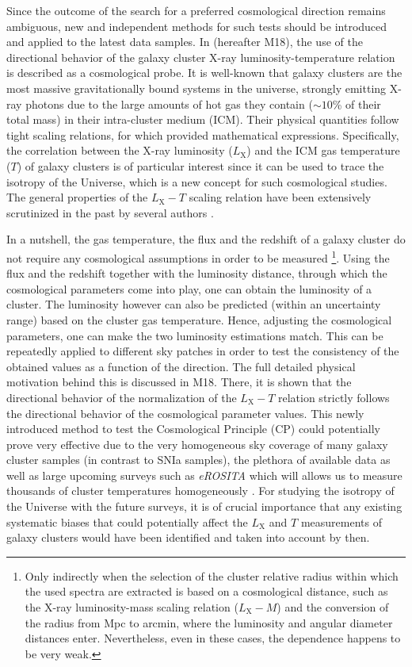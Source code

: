 \documentclass{aa}   %
\begin{document}
Since the outcome of the search for a preferred cosmological direction remains ambiguous, new and independent methods for such tests should be introduced and applied to the latest data samples. In \citet{Migkas18} (hereafter M18), the use of the directional behavior of the galaxy cluster X-ray luminosity-temperature relation is described as a cosmological probe. It is well-known that galaxy clusters are the most massive gravitationally bound systems in the universe, strongly emitting X-ray photons due to the large amounts of hot gas they contain ($\sim 10$\% of their total mass) in their intra-cluster medium (ICM). Their physical quantities follow tight scaling relations, for which \citet{kaiser} provided mathematical expressions. Specifically, the correlation between the X-ray luminosity ($L_{\text{X}}$) and the ICM gas temperature ($T$) of galaxy clusters is of particular interest since it can be used to trace the isotropy of the Universe, which is a new concept for such cosmological studies. The general properties of the $L_{\text{X}}-T$ scaling relation have been extensively scrutinized in the past by several authors \citep[e.g.,][]{vikhl02,pacaud07,pratt,mittal,reichert,hilton,maughan,bharad,lovisari,giles,zou,Migkas18,xcs2}.

In a nutshell, the gas temperature, the flux and the redshift of a galaxy cluster do not require any cosmological assumptions in order to be measured \footnote{Only indirectly when the selection of the cluster relative radius within which the used spectra are extracted is based on a cosmological distance, such as the X-ray luminosity-mass scaling relation ($L_{\text{X}}-M$) and the conversion of the radius from Mpc to arcmin, where the luminosity and angular diameter distances enter. Nevertheless, even in these cases, the dependence happens to be very weak.}. Using the flux and the redshift together with the luminosity distance, through which the cosmological parameters come into play, one can obtain the luminosity of a cluster. The luminosity however can also be predicted (within an uncertainty range) based on the cluster gas temperature. Hence, adjusting the cosmological parameters, one can make the two luminosity estimations match. This can be repeatedly applied to different sky patches in order to test the consistency of the obtained values as a function of the direction. The full detailed physical motivation behind this is discussed in M18. There, it is shown that the directional behavior of the normalization of the $L_{\text{X}}-T$ relation strictly follows the directional behavior of the cosmological parameter values. This newly introduced method to test the Cosmological Principle (CP) could potentially prove very effective due to the very homogeneous sky coverage of many galaxy cluster samples (in contrast to SNIa samples), the plethora of available data as well as large upcoming surveys such as \textit{eROSITA} \citep{erosita16} which will allows us to measure thousands of cluster temperatures homogeneously \citep{borm}. For studying the isotropy of the Universe with the future surveys, it is of crucial importance that any existing systematic biases that could potentially affect the $L_{\text{X}}$ and $T$ measurements of galaxy clusters would have been identified and taken into account by then.
\end{document}
